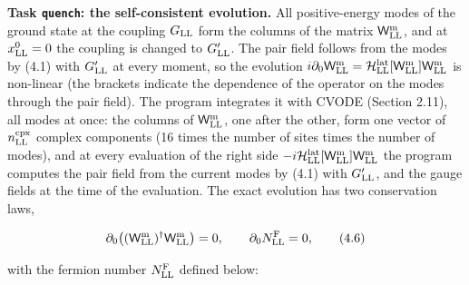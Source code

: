 \documentclass[
  10pt,
]{article}
\begin{document}
\textbf{Task \texttt{quench}: the self-consistent evolution.} All
positive-energy modes of the ground state at the coupling \(G_{\rm LL}\)
form the columns of the matrix \(\mathsf W^{\rm m}_{\rm LL}\), and at
\(x^0_{\rm LL}=0\) the coupling is changed to \(G'_{\rm LL}\). The pair
field follows from the modes by (4.1) with \(G'_{\rm LL}\) at every
moment, so the evolution
\(i\partial_0\mathsf W^{\rm m}_{\rm LL}=\mathcal H^{\rm lat}_{\rm LL}[\mathsf W^{\rm m}_{\rm LL}]\mathsf W^{\rm m}_{\rm LL}\)
is non-linear (the brackets indicate the dependence of the operator on
the modes through the pair field). The program integrates it with CVODE
(Section 2.11), all modes at once: the columns of
\(\mathsf W^{\rm m}_{\rm LL}\), one after the other, form one vector of
\(n^{\rm cpx}_{\rm LL}\) complex components (16 times the number of
sites times the number of modes), and at every evaluation of the right
side
\(-i\mathcal H^{\rm lat}_{\rm LL}[\mathsf W^{\rm m}_{\rm LL}]\mathsf W^{\rm m}_{\rm LL}\)
the program computes the pair field from the current modes by (4.1) with
\(G'_{\rm LL}\), and the gauge fields at the time of the evaluation. The
exact evolution has two conservation laws,

\[\partial_0\big((\mathsf W^{\rm m}_{\rm LL})^\dagger\mathsf W^{\rm m}_{\rm LL}\big)=0,\qquad\partial_0N^{\rm F}_{\rm LL}=0,\tag{4.6}\]

with the fermion number \(N^{\rm F}_{\rm LL}\) defined below:
\end{document}
